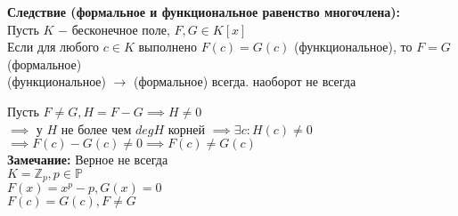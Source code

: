 \textbf{Следствие (формальное и функциональное равенство многочлена):}\\
Пусть $K$ $-$ бесконечное поле, $F,G \in K[x]$ \\
Если для любого $c \in K$ выполнено $F(c)=G(c)$ (функциональное), то $F=G$ (формальное)\\
(функциональное) $\to$ (формальное) всегда. наоборот не всегда
\begin{replacementproof}
	Пусть $F \neq G, H=F-G \implies H \neq 0$\\
	$\implies$ у $H$ не более чем  $degH$ корней  $\implies \exists c: H(c) \neq 0$ \\
	$\implies F(c) -G(c) \neq 0 \implies F(c) \neq G(c)$ \\
	\textbf{Замечание:} Верное не всегда\\
	$K=\mathbb{Z}_p, p \in \mathbb{P}$\\
	$F(x)=x^{p}-p, G(x)=0$ \\
	$F(c)=G(c), F \neq G$
\end{replacementproof}

